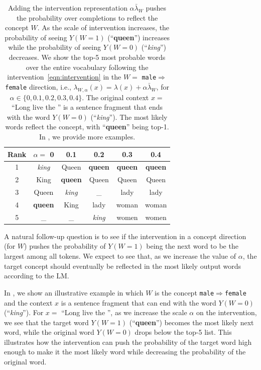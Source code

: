 \documentclass{article}
\theoremstyle{plain}
\theoremstyle{definition}
\theoremstyle{remark}
\newcommand{\ConceptDirName}[2]{\texttt{#1$\Rightarrow$#2}}
\begin{document}
\begin{table}[t]
\caption{Adding the intervention representation $\alpha \bar\lambda_W$ pushes the probability over completions to reflect the concept $W$.
    As the scale of intervention increases, the probability of seeing $Y(W=1)$ (``\textbf{queen}'') increases while the probability of seeing $Y(W=0)$ (``\textit{king}'') decreases. We show the top-5 most probable words over the entire vocabulary following the intervention~\eqref{eqn:intervention} in the $W=$ \ConceptDirName{male}{female} direction, i.e., $\lambda_{W,\alpha}(x) = \lambda(x) + \alpha \bar\lambda_W$, for $\alpha \in \{0, 0.1, 0.2, 0.3, 0.4\}$.
    The original context $x=$ ``Long live the '' is a sentence fragment that ends with the word $Y(W=0)$ (``\textit{king}'').
    The most likely words reflect the concept, with ``\textbf{queen}'' being top-1. In , we provide more examples.}
\label{tbl:intervention_topk}
\vskip 0.15in
\begin{center}
\begin{small}
\begin{tabular}{cccccc}
\toprule
Rank  & $\alpha =$ 0 & 0.1 & 0.2 & 0.3 & 0.4\\
\midrule
1 & \it king & Queen & \bf queen & \bf queen & \bf queen \\
2 & King & \bf queen & Queen & Queen & Queen \\
3 & Queen & \it king & \_ & lady & lady \\
4 & \bf queen & King & lady & woman & woman \\
5 & \_ & \_ & \it king & women & women \\
\bottomrule
\end{tabular}
\end{small}
\end{center}
\vskip -0.1in
\end{table}

A natural follow-up question is to see if the intervention in a concept direction (for $W$) pushes the probability of $Y(W=1)$ being the next word to be the largest among all tokens.
We expect to see that, as we increase the value of $\alpha$, the target concept should eventually be reflected in the most likely output words according to the LM.

In , we show an illustrative example in which $W$ is the concept \ConceptDirName{male}{female} and the context $x$ is a sentence fragment that can end with the word $Y(W=0)$ (``\textit{king}'').
For $x =$ ``Long live the '', as we increase the scale $\alpha$ on the intervention, we see that the target word $Y(W=1)$ (``\textbf{queen}'') becomes the most likely next word, while the original word $Y(W=0)$ drops below the top-5 list.
This illustrates how the intervention can push the probability of the target word high enough to make it the most likely word while decreasing the probability of the original word.
\end{document}
